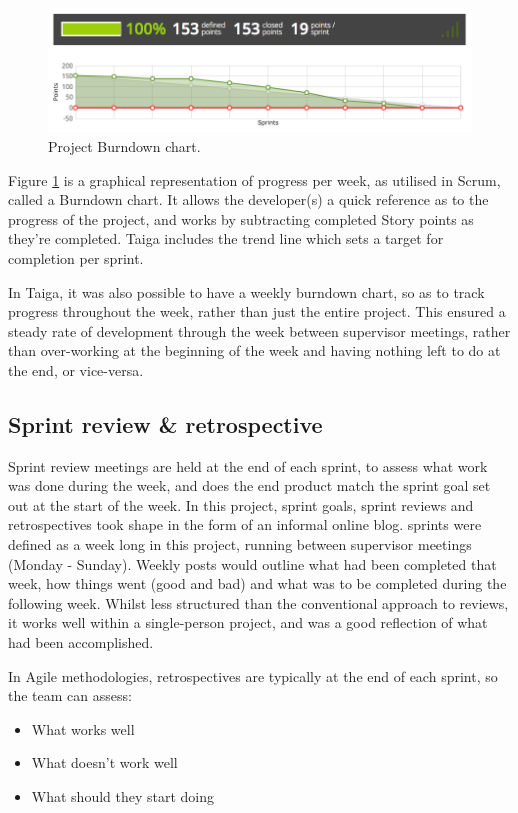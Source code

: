 \begin{figure}[H]
  \centering
  \includegraphics[width=\textwidth]{Chapter2/software-img/burndown.png}
  \caption{Project Burndown chart.}
  \label{fig:burndown}
\end{figure}

Figure \ref{fig:burndown} is a graphical representation of progress per week, as utilised in Scrum, called a Burndown chart. It allows the developer(s) a quick reference as to the progress of the project, and works by subtracting completed Story points as they're completed. Taiga includes the trend line which sets a target for completion per sprint.

In Taiga, it was also possible to have a weekly burndown chart, so as to track progress throughout the week, rather than just the entire project. This ensured a steady rate of development through the week between supervisor meetings, rather than over-working at the beginning of the week and having nothing left to do at the end, or vice-versa.

\subsection{Sprint review \& retrospective}

Sprint review meetings are held at the end of each sprint, to assess what work was done during the week, and does the end product match the sprint goal set out at the start of the week. In this project, sprint goals, sprint reviews and retrospectives took shape in the form of an informal online blog. sprints were defined as a week long in this project, running between supervisor meetings (Monday - Sunday). Weekly posts would outline what had been completed that week, how things went (good and bad) and what was to be completed during the following week. Whilst less structured than the conventional approach to reviews, it works well within a single-person project, and was a good reflection of what had been accomplished.

In Agile methodologies, retrospectives are typically at the end of each sprint, so the team can assess:
\begin{itemize}
  \item What works well
  \item What doesn't work well
  \item What should they start doing
\end{itemize}

